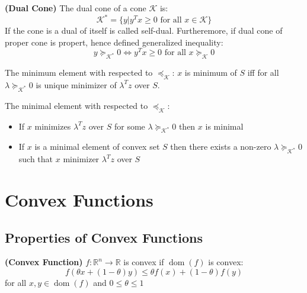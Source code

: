 \begin{definition}{\textbf{(Dual Cone)}}
    The dual cone of a cone $ \mathcal{K}$ is:
    \begin{equation*}
        \mathcal{K}^* = \Big\{ y | y^Tx \ge 0 \text{ for all } x \in \mathcal{K} \Big\}
    \end{equation*}
    If the cone is a dual of itself is called self-dual. Furtheremore, if dual cone of proper cone is propert, hence defined generalized inequality:
    \begin{equation*}
        y \succeq_{\mathcal{K}^*} 0 \iff y^Tx \ge 0 \text{ for all } x \succeq_{\mathcal{K}} 0
    \end{equation*}
\end{definition}

\begin{proposition}
    The minimum element with respected to $\preceq_\mathcal{K}$: $x$ is minimum of $S$ iff for all $\lambda\succeq_{\mathcal{K}^*}0$ is unique minimizer of $\lambda^Tz$ over $S$.
\end{proposition}

\begin{proposition}
    The minimal element with respected to $\preceq_\mathcal{K}$:
    \begin{itemize}
        \item If $x$ minimizes $\lambda^Tz$ over $S$ for some $\lambda\succeq_{\mathcal{K}^*}0$ then $x$ is minimal
        \item If $x$ is a minimal element of convex set $S$ then there exists a non-zero $\lambda\succeq_{\mathcal{K}^*}0$ such that $x$ minimizer $\lambda^Tz$ over $S$
    \end{itemize}
\end{proposition}

\section{Convex Functions}

\subsection{Properties of Convex Functions}

\begin{definition}{\textbf{(Convex Function)}}
    $f:\mathbb{R}^n\rightarrow \mathbb{R}$ is convex if $\operatorname{dom}(f)$ is convex:
    \begin{equation*}
        f(\theta x + (1-\theta)y) \le \theta f(x) + (1-\theta)f(y)
    \end{equation*}
    for all $x, y\in\operatorname{dom}(f)$ and $0\le\theta\le1$
\end{definition}

